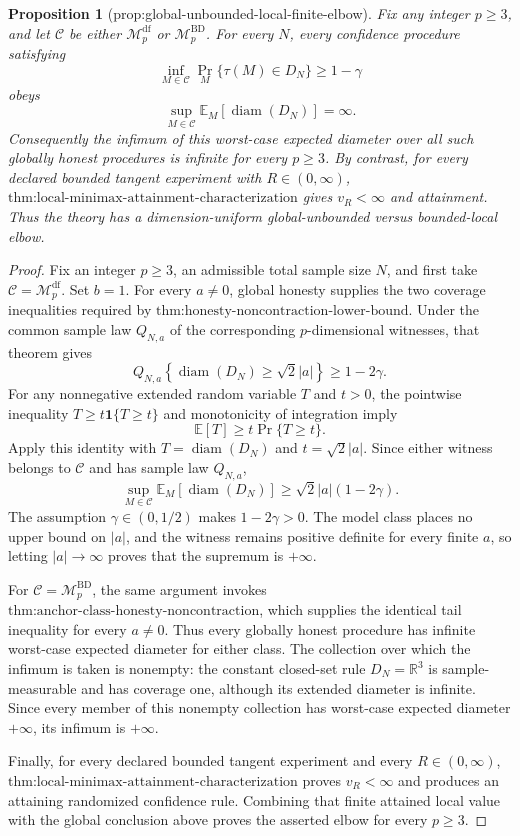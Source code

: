 \documentclass{article}
\newtheorem{proposition}{Proposition}
\begin{document}
\begin{proposition}[prop:global-unbounded-local-finite-elbow]\label{prop:global-unbounded-local-finite-elbow}
Fix any integer \(p\ge3\), and let \(\mathcal C\) be either \(\mathcal M_p^{\mathrm{df}}\) or \(\mathcal M_p^{\mathrm{BD}}\).  For every \(N\), every confidence procedure satisfying
\[
 \inf_{M\in\mathcal C}\Pr_M\{\tau(M)\in D_N\}\ge1-\gamma
\]
obeys
\[
 \sup_{M\in\mathcal C}\mathbb E_M\!\left[\operatorname{diam}(D_N)\right]=\infty.
\]
Consequently the infimum of this worst-case expected diameter over all such globally honest procedures is infinite for every \(p\ge3\).  By contrast, for every declared bounded tangent experiment with \(R\in(0,\infty)\), \(\text{thm:local-minimax-attainment-characterization}\) gives \(v_R<\infty\) and attainment.  Thus the theory has a dimension-uniform global-unbounded versus bounded-local elbow.
\end{proposition}
\begin{proof}
Fix an integer \(p\ge3\), an admissible total sample size \(N\), and first take \(\mathcal C=\mathcal M_p^{\mathrm{df}}\).  Set \(b=1\).  For every \(a\neq0\), global honesty supplies the two coverage inequalities required by \(\text{thm:honesty-noncontraction-lower-bound}\).  Under the common sample law \(Q_{N,a}\) of the corresponding \(p\)-dimensional witnesses, that theorem gives
\[
 Q_{N,a}\!\left\{\operatorname{diam}(D_N)\ge\sqrt2|a|\right\}\ge1-2\gamma.
\]
For any nonnegative extended random variable \(T\) and \(t>0\), the pointwise inequality \(T\ge t\mathbf 1\{T\ge t\}\) and monotonicity of integration imply
\[
 \mathbb E[T]\ge t\Pr\{T\ge t\}.
\]
Apply this identity with \(T=\operatorname{diam}(D_N)\) and \(t=\sqrt2|a|\).  Since either witness belongs to \(\mathcal C\) and has sample law \(Q_{N,a}\),
\[
 \sup_{M\in\mathcal C}\mathbb E_M\!\left[\operatorname{diam}(D_N)\right]
 \ge \sqrt2|a|(1-2\gamma).
\]
The assumption \(\gamma\in(0,1/2)\) makes \(1-2\gamma>0\).  The model class places no upper bound on \(|a|\), and the witness remains positive definite for every finite \(a\), so letting \(|a|\to\infty\) proves that the supremum is \(+\infty\).

For \(\mathcal C=\mathcal M_p^{\mathrm{BD}}\), the same argument invokes \(\text{thm:anchor-class-honesty-noncontraction}\), which supplies the identical tail inequality for every \(a\neq0\).  Thus every globally honest procedure has infinite worst-case expected diameter for either class.  The collection over which the infimum is taken is nonempty: the constant closed-set rule \(D_N=\mathbb R^3\) is sample-measurable and has coverage one, although its extended diameter is infinite.  Since every member of this nonempty collection has worst-case expected diameter \(+\infty\), its infimum is \(+\infty\).

Finally, for every declared bounded tangent experiment and every \(R\in(0,\infty)\), \(\text{thm:local-minimax-attainment-characterization}\) proves \(v_R<\infty\) and produces an attaining randomized confidence rule.  Combining that finite attained local value with the global conclusion above proves the asserted elbow for every \(p\ge3\).
\end{proof}
\end{document}
